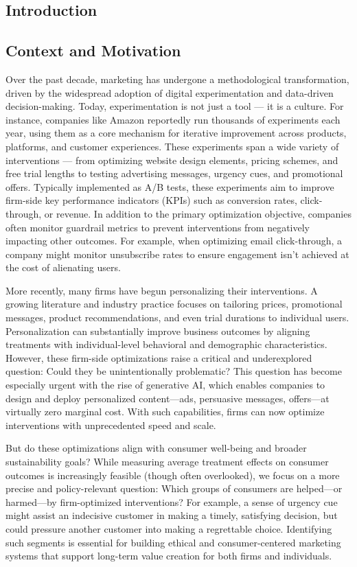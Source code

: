 \documentclass[11pt,letterpaper,english]{article}
\theoremstyle{definition}
\theoremstyle{definition}
\begin{document}
\begin{bibunit}
\newpage
\section{Introduction}
\label{sec:intro}
\subsection{Context and Motivation}
Over the past decade, marketing has undergone a methodological transformation, driven by the widespread adoption of digital experimentation and data-driven decision-making. Today, experimentation is not just a tool — it is a culture. For instance, companies like Amazon reportedly run thousands of experiments each year, using them as a core mechanism for iterative improvement across products, platforms, and customer experiences. These experiments span a wide variety of interventions — from optimizing website design elements, pricing schemes, and free trial lengths to testing advertising messages, urgency cues, and promotional offers. Typically implemented as A/B tests, these experiments aim to improve firm-side key performance indicators (KPIs) such as conversion rates, click-through, or revenue. In addition to the primary optimization objective, companies often monitor guardrail metrics to prevent interventions from negatively impacting other outcomes. For example, when optimizing email click-through, a company might monitor unsubscribe rates to ensure engagement isn't achieved at the cost of alienating users.

More recently, many firms have begun personalizing their interventions. A growing literature and industry practice focuses on tailoring prices, promotional messages, product recommendations, and even trial durations to individual users. Personalization can substantially improve business outcomes by aligning treatments with individual-level behavioral and demographic characteristics. However, these firm-side optimizations raise a critical and underexplored question: Could they be unintentionally problematic? This question has become especially urgent with the rise of generative AI, which enables companies to design and deploy personalized content—ads, persuasive messages, offers—at virtually zero marginal cost. With such capabilities, firms can now optimize interventions with unprecedented speed and scale.

But do these optimizations align with consumer well-being and broader sustainability goals? While measuring average treatment effects on consumer outcomes is increasingly feasible (though often overlooked), we focus on a more precise and policy-relevant question: Which groups of consumers are helped—or harmed—by firm-optimized interventions? For example, a sense of urgency cue might assist an indecisive customer in making a timely, satisfying decision, but could pressure another customer into making a regrettable choice. Identifying such segments is essential for building ethical and consumer-centered marketing systems that support long-term value creation for both firms and individuals.
\setcounter{page}{1}

\end{bibunit}
\end{document}

